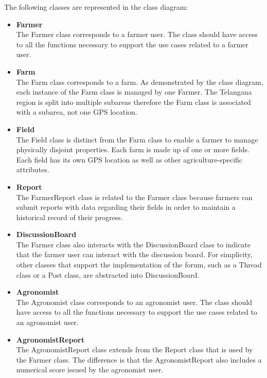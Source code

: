 The following classes are represented in the class diagram:
\begin{itemize}

\item \textbf{Farmer}\\
The Farmer class corresponds to a farmer user. The class should have access to all the functions necessary to support the use cases related to a farmer user. 

\item \textbf{Farm}\\
The Farm class corresponds to a farm. As demonstrated by the class diagram, each instance of the Farm class is managed by one Farmer. The Telangana region is split into multiple subareas therefore the Farm class is associated with a subarea, not one GPS location.

\item \textbf{Field}\\
The Field class is distinct from the Farm class to enable a farmer to manage physically disjoint properties. Each farm is made up of one or more fields. Each field has its own GPS location as well as other agriculture-specific attributes.

\item \textbf{Report}\\
The FarmerReport class is related to the Farmer class because farmers can submit reports with data regarding their fields in order to maintain a historical record of their progress. 

\item \textbf{DiscussionBoard}\\
The Farmer class also interacts with the DiscussionBoard class to indicate that the farmer user can interact with the discussion board. For simplicity, other classes that support the implementation of the forum, such as a Thread class or a Post class, are abstracted into DiscussionBoard. 

\item \textbf{Agronomist}\\
The Agronomist class corresponds to an agronomist user. The class should have access to all the functions necessary to support the use cases related to an agronomist user. 

\item \textbf{AgronomistReport}\\
The AgronomistReport class extends from the Report class that is used by the Farmer class. The difference is that the AgronomistReport also includes a numerical score issued by the agronomist user. 


\end{itemize}
